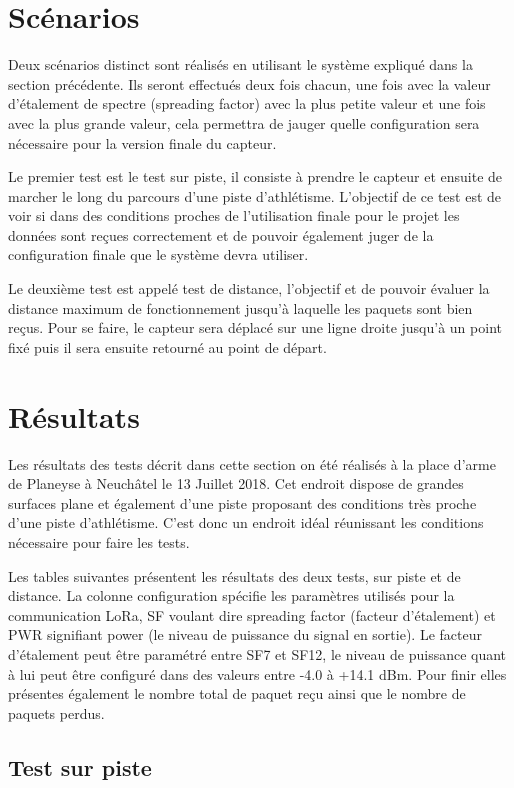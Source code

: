 \section{Scénarios}

Deux scénarios distinct sont réalisés en utilisant le système expliqué dans la section précédente. Ils seront effectués deux fois chacun, une fois avec la valeur d'étalement de spectre (spreading factor) avec la plus petite valeur et une fois avec la plus grande valeur, cela permettra de jauger quelle configuration sera nécessaire pour la version finale du capteur.

Le premier test est le test sur piste, il consiste à prendre le capteur et ensuite de marcher le long du parcours d'une piste d'athlétisme. L'objectif de ce test est de voir si dans des conditions proches de l'utilisation finale pour le projet les données sont reçues correctement et de pouvoir également juger de la configuration finale que le système devra utiliser.

Le deuxième test est appelé test de distance, l'objectif et de pouvoir évaluer la distance maximum de fonctionnement jusqu'à laquelle les paquets sont bien reçus. Pour se faire, le capteur sera déplacé sur une ligne droite jusqu'à un point fixé puis il sera ensuite retourné au point de départ.

\section{Résultats}

Les résultats des tests décrit dans cette section on été réalisés à la place d'arme de Planeyse à Neuchâtel le 13 Juillet 2018. Cet endroit dispose de grandes surfaces plane et également d'une piste proposant des conditions très proche d'une piste d'athlétisme. C'est donc un endroit idéal réunissant les conditions nécessaire pour faire les tests.

Les  tables suivantes présentent les résultats des deux tests, sur piste et de distance. La colonne configuration spécifie les paramètres utilisés pour la communication LoRa, SF voulant dire spreading factor (facteur d'étalement) et PWR signifiant power (le niveau de puissance du signal en sortie).  Le facteur d'étalement peut être paramétré entre SF7 et SF12, le niveau de puissance quant à lui peut être configuré dans des valeurs entre -4.0 à +14.1 dBm.
Pour finir elles présentes également le nombre total de paquet reçu ainsi que le nombre de paquets perdus.

\subsection{Test sur piste}

